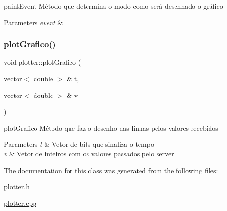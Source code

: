 paint\+Event Método que determina o modo como será desenhado o gráfico 


\begin{DoxyParams}{Parameters}
{\em event} & \\
\hline
\end{DoxyParams}
\mbox{\label{classplotter_af9cd37923cfa75a3b4352d7d0c38d67f}} 
\subsubsection{\texorpdfstring{plot\+Grafico()}{plotGrafico()}}
{\footnotesize\ttfamily void plotter\+::plot\+Grafico (\begin{DoxyParamCaption}\item[{vector$<$ double $>$ \&}]{t,  }\item[{vector$<$ double $>$ \&}]{v }\end{DoxyParamCaption})}



plot\+Grafico Método que faz o desenho das linhas pelos valores recebidos 


\begin{DoxyParams}{Parameters}
{\em t} & Vetor de bits que sinaliza o tempo \\
\hline
{\em v} & Vetor de inteiros com os valores passados pelo server \\
\hline
\end{DoxyParams}


The documentation for this class was generated from the following files\+:\begin{DoxyCompactItemize}
\item 
\mbox{\hyperlink{plotter_8h}{plotter.\+h}}\item 
\mbox{\hyperlink{plotter_8cpp}{plotter.\+cpp}}\end{DoxyCompactItemize}
